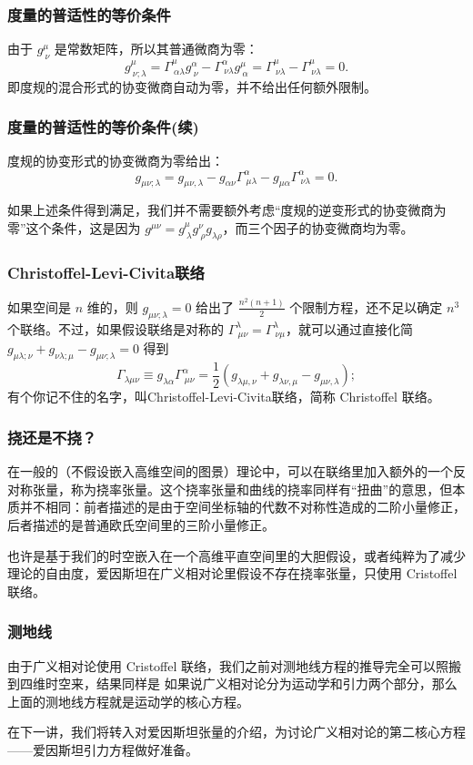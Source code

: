 \documentclass[CJK,13pt]{beamer}
\begin{document}
\begin{frame}
  \frametitle{度量的普适性的等价条件}
  由于 $g^\mu_{\ \nu}$ 是常数矩阵，所以其普通微商为零：
  $$g^\mu_{\ \nu;\lambda} = \Gamma^\mu_{\ \alpha\lambda}g^\alpha_{\ \nu} - \Gamma^\alpha_{\ \nu\lambda}g^\mu_{\ \alpha} = \Gamma^\mu_{\ \nu\lambda} - \Gamma^\mu_{\ \nu\lambda} = 0.$$
  即度规的混合形式的协变微商自动为零，并不给出任何额外限制。
\end{frame}


\begin{frame}
  \frametitle{度量的普适性的等价条件(续)}
  度规的协变形式的协变微商为零给出：
  $$g_{\mu\nu;\lambda} = g_{\mu\nu,\lambda}-g_{\alpha\nu}\Gamma^\alpha_{\ \mu\lambda}-g_{\mu\alpha}\Gamma^\alpha_{\ \nu\lambda}=0.$$
  
  如果上述条件得到满足，我们并不需要额外考虑“度规的逆变形式的协变微商为零”这个条件，这是因为 $g^{\mu\nu} = g^\mu_{\ \lambda}g^\nu_{\ \rho} g_{\lambda\rho}$，而三个因子的协变微商均为零。
\end{frame}

\begin{frame}
  \frametitle{Christoffel-Levi-Civita联络}
    如果空间是 $n$ 维的，则 $g_{\mu\nu;\lambda}= 0$ 给出了 $\frac{n^2(n+1)}{2}$ 个限制方程，还不足以确定 $n^3$ 个联络。不过，{\blue 如果假设联络是对称的 $\Gamma^\lambda_{\ \mu\nu}=\Gamma^\lambda_{\ \nu\mu}$}，就可以通过直接化简 $g_{\mu\lambda;\nu}+g_{\nu\lambda;\mu}-g_{\mu\nu;\lambda}=0$ 得到
  {\blue  $$\Gamma_{\lambda\mu\nu}\equiv g_{\lambda\alpha}\Gamma^\alpha_{\ \mu\nu}=\frac{1}{2}\left(g_{\lambda\mu,\nu}+g_{\lambda\nu,\mu}-g_{\mu\nu,\lambda}\right);$$}
  有个你记不住的名字，叫{\blue Christoffel-Levi-Civita联络，简称 Christoffel 联络}。

\end{frame}


\begin{frame}
  \frametitle{挠还是不挠？}
  在一般的（不假设嵌入高维空间的图景）理论中，可以在联络里加入额外的一个反对称张量，称为{\blue 挠率张量}。这个挠率张量和曲线的挠率同样有“扭曲”的意思，但本质并不相同：前者描述的是由于空间坐标轴的代数不对称性造成的二阶小量修正，后者描述的是普通欧氏空间里的三阶小量修正。

  
  也许是基于我们的时空嵌入在一个高维平直空间里的大胆假设，或者纯粹为了减少理论的自由度，爱因斯坦在{\blue 广义相对论里假设不存在挠率张量，只使用 Cristoffel 联络}。
\end{frame}

\begin{frame}
  \frametitle{测地线}
  由于广义相对论使用 Cristoffel 联络，我们之前对测地线方程的推导完全可以照搬到四维时空来，结果同样是
  如果说广义相对论分为运动学和引力两个部分，那么上面的测地线方程就是运动学的核心方程。
\end{frame}


\begin{frame}
  在下一讲，我们将转入对爱因斯坦张量的介绍，为讨论广义相对论的第二核心方程——爱因斯坦引力方程做好准备。
\end{frame}

\ech
\end{document}

